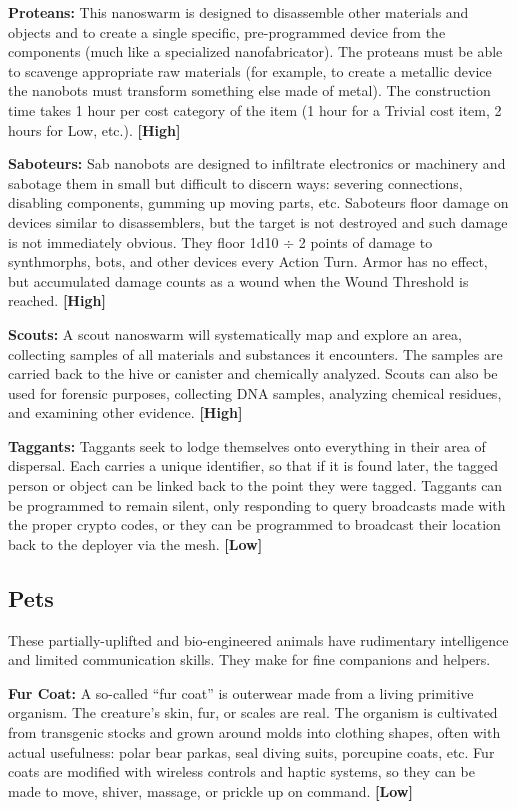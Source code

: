 \textbf{Proteans:} This nanoswarm is designed to disassemble other materials and objects and to create a single specific, pre-programmed device from the components (much like a specialized nanofabricator). The proteans must be able to scavenge appropriate raw materials (for example, to create a metallic device the nanobots must transform something else made of metal). The construction time takes 1 hour per cost category of the item (1 hour for a Trivial cost item, 2 hours for Low, etc.). \textbf{[High]}

\textbf{Saboteurs:} Sab nanobots are designed to infiltrate electronics or machinery and sabotage them in small but difficult to discern ways: severing connections, disabling components, gumming up moving parts, etc. Saboteurs floor damage on devices similar to disassemblers, but the target is not destroyed and such damage is not immediately obvious. They floor 1d10 $\div$ 2 points of damage to synthmorphs, bots, and other devices every Action Turn. Armor has no effect, but accumulated damage counts as a wound when the Wound Threshold is reached. \textbf{[High]}

\textbf{Scouts:} A scout nanoswarm will systematically map and explore an area, collecting samples of all materials and substances it encounters. The samples are carried back to the hive or canister and chemically analyzed. Scouts can also be used for forensic purposes, collecting DNA samples, analyzing chemical residues, and examining other evidence. \textbf{[High]}

\textbf{Taggants:} Taggants seek to lodge themselves onto everything in their area of dispersal. Each carries a unique identifier, so that if it is found later, the tagged person or object can be linked back to the point they were tagged. Taggants can be programmed to remain silent, only responding to query broadcasts made with the proper crypto codes, or they can be programmed to broadcast their location back to the deployer via the mesh. \textbf{[Low]}


\subsection{Pets}
\label{sec:pets}

These partially-uplifted and bio-engineered animals have rudimentary intelligence and limited communication skills. They make for fine companions and helpers.

\textbf{Fur Coat:} A so-called ``fur coat'' is outerwear made from a living primitive organism. The creature’s skin, fur, or scales are real. The organism is cultivated from transgenic stocks and grown around molds into clothing shapes, often with actual usefulness: polar bear parkas, seal diving suits, porcupine coats, etc. Fur coats are modified with wireless controls and haptic systems, so they can be made to move, shiver, massage, or prickle up on command. \textbf{[Low]}

